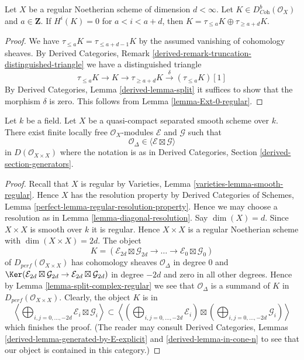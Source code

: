\begin{lemma}
\label{lemma-split-complex-regular}
Let $X$ be a regular Noetherian scheme of dimension $d < \infty$.
Let $K \in D^b_{\textit{Coh}}(\mathcal{O}_X)$ and $a \in \mathbf{Z}$.
If $H^i(K) = 0$ for $a < i < a + d$, then
$K = \tau_{\leq a}K \oplus \tau_{\geq a + d}K$.
\end{lemma}

\begin{proof}
We have $\tau_{\leq a}K = \tau_{\leq a + d - 1}K$ by the assumed
vanishing of cohomology sheaves. By Derived Categories, Remark
\ref{derived-remark-truncation-distinguished-triangle}
we have a distinguished triangle
$$
\tau_{\leq a}K \to K \to \tau_{\geq a + d}K \xrightarrow{\delta}
(\tau_{\leq a}K)[1]
$$
By Derived Categories, Lemma \ref{derived-lemma-split} it
suffices to show that the morphism $\delta$ is zero.
This follows from Lemma \ref{lemma-Ext-0-regular}.
\end{proof}

\begin{lemma}
\label{lemma-diagonal-trick}
Let $k$ be a field. Let $X$ be a quasi-compact separated smooth scheme over $k$.
There exist finite locally free $\mathcal{O}_X$-modules
$\mathcal{E}$ and $\mathcal{G}$ such that
$$
\mathcal{O}_\Delta \in \langle \mathcal{E} \boxtimes \mathcal{G} \rangle
$$
in $D(\mathcal{O}_{X \times X})$ where the notation is as in
Derived Categories, Section \ref{derived-section-generators}.
\end{lemma}

\begin{proof}
Recall that $X$ is regular by
Varieties, Lemma \ref{varieties-lemma-smooth-regular}.
Hence $X$ has the resolution property by
Derived Categories of Schemes, Lemma
\ref{perfect-lemma-regular-resolution-property}.
Hence we may choose a resolution as in Lemma \ref{lemma-diagonal-resolution}.
Say $\dim(X) = d$. Since $X \times X$ is smooth over $k$ it is regular.
Hence $X \times X$ is a regular Noetherian scheme with
$\dim(X \times X) = 2d$. The object
$$
K = (\mathcal{E}_{2d} \boxtimes \mathcal{G}_{2d} \to
\ldots \to
\mathcal{E}_0 \boxtimes \mathcal{G}_0)
$$
of $D_{perf}(\mathcal{O}_{X \times X})$
has cohomology sheaves $\mathcal{O}_\Delta$
in degree $0$ and $\Ker(\mathcal{E}_{2d} \boxtimes \mathcal{G}_{2d} \to
\mathcal{E}_{2d} \boxtimes \mathcal{G}_{2d})$ in degree $-2d$ and zero
in all other degrees.
Hence by Lemma \ref{lemma-split-complex-regular} we see that
$\mathcal{O}_\Delta$ is a summand of $K$ in
$D_{perf}(\mathcal{O}_{X \times X})$.
Clearly, the object $K$ is in
$$
\left\langle
\bigoplus\nolimits_{i, j = 0, \ldots, -2d} \mathcal{E}_i \boxtimes \mathcal{G}_i
\right\rangle
\subset
\left\langle
\left(\bigoplus\nolimits_{i, j = 0, \ldots, -2d} \mathcal{E}_i\right)
\boxtimes
\left(\bigoplus\nolimits_{i, j = 0, \ldots, -2d} \mathcal{G}_i\right)
\right\rangle
$$
which finishes the proof. (The reader may consult
Derived Categories, Lemmas \ref{derived-lemma-generated-by-E-explicit} and
\ref{derived-lemma-in-cone-n} to see that our object is contained in this
category.)
\end{proof}

